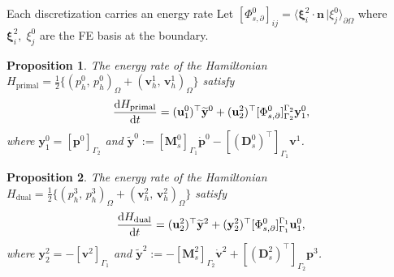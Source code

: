 \documentclass[aspectratio=169]{beamer}
\newcommand{\inpr}[3][]{\ensuremath{( #2, \, #3 )_{#1}}}
\newcommand{\dualpr}[3][]{\ensuremath{\langle #2 \, \vert #3 \rangle_{#1}}}
\newtheorem{proposition}{Proposition}
\begin{document}
\begin{frame}{Each discretization carries an energy rate}
	Let $[{\Phi}^{0}_{s, \partial}]_{ij} = \dualpr[\partial\Omega]{\bm{\xi}_i^2 \cdot \bm{n}}{\xi^0_j}$ where $\bm{\xi}_i^2, \; \xi^0_j$ are the FE basis at the boundary.
	\begin{proposition}
		The energy rate of the Hamiltonian $H_{\mathrm{primal}} = \frac{1}{2}\{\inpr[\Omega]{p^0_h}{p^0_h} + \inpr[\Omega]{\bm{v}^1_h}{\bm{v}^1_h}\}$ satisfy
		\begin{equation*}
			\diff{{H}_{\mathrm{primal}}}{t} = (\mathbf{u}^{0}_1)^\top \widetilde{\mathbf{y}}^{0} + ({\mathbf{u}}^{2}_2)^\top[{\Phi}^{0}_{s, \partial}]_{\Gamma_2}^{\Gamma_2} \mathbf{y}^{0}_1,
		\end{equation*} 
		where ${\mathbf{y}}^{0}_1 = [\mathbf{p}^{0}]_{\Gamma_2}$ and $
			\widetilde{\mathbf{y}}^{0} := [\mathbf{M}^{0}_{s}]_{\Gamma_1} \dot{\mathbf{p}}^{0} -[(\mathbf{D}_{s}^{0})^\top]_{\Gamma_1} {\mathbf{v}}^1$.
	\end{proposition}

	\begin{proposition}
		The energy rate of the Hamiltonian $H_{\mathrm{dual}} = \frac{1}{2}\{\inpr[\Omega]{p^3_h}{p^3_h} + \inpr[\Omega]{\bm{v}^2_h}{\bm{v}^2_h}\}$ satisfy
	\begin{equation*}
		\diff{{H}_{\mathrm{dual}}}{t} = ({\mathbf{u}}^{2}_2)^\top \widetilde{\mathbf{y}}^{2} + (\mathbf{y}^{2}_2)^\top[{\Phi}^{0}_{s, \partial}]_{\Gamma_1}^{\Gamma_1} \mathbf{u}^{0}_1, 
	\end{equation*} 
	where ${\mathbf{y}}^{2}_2 = -[{\mathbf{v}}^{2}]_{\Gamma_1}$ and $\widetilde{\mathbf{y}}^{2} :=  -[\mathbf{M}^{2}_{s}]_{\Gamma_2} \dot{{\mathbf{v}}}^{2}  +[(\mathbf{D}_{s}^{2})^\top]_{\Gamma_2} {\mathbf{p}}^3$.
	\end{proposition}
\end{frame}
\end{document}
